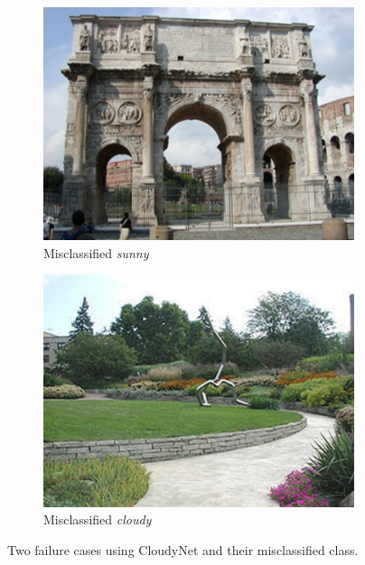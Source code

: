 \documentclass[10pt,twocolumn,letterpaper]{article}
\begin{document}
\begin{figure}
	\centering
  \begin{subfigure}[b]{0.49\columnwidth}
    \centering
		\includegraphics[width=\columnwidth]{figs/ex_bad_tc/cloudy_3732.jpg}
    \caption{Misclassified \emph{sunny}}
    \label{fig:ex_bad_cloudy}
	\end{subfigure}	
  \begin{subfigure}[b]{0.49\columnwidth}
    \centering
		\includegraphics[width=\columnwidth]{figs/ex_bad_tc/sunny_2877.jpg}
    \caption{Misclassified \emph{cloudy}}
    \label{fig:ex_bad_sunny}
	\end{subfigure}	
	\caption{Two failure cases using CloudyNet and their misclassified class.}
	\label{fig:ex_bad_cloudynet}
\end{figure}
\end{document}
